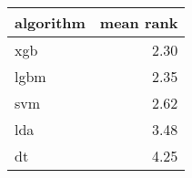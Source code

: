 \begin{tabular}{lr}
  \toprule
{\bfseries algorithm} & {\bfseries mean rank} \\ 
  \midrule
xgb & 2.30 \\ 
  lgbm & 2.35 \\ 
  svm & 2.62 \\ 
  lda & 3.48 \\ 
  dt & 4.25 \\ 
   \bottomrule
\end{tabular}

